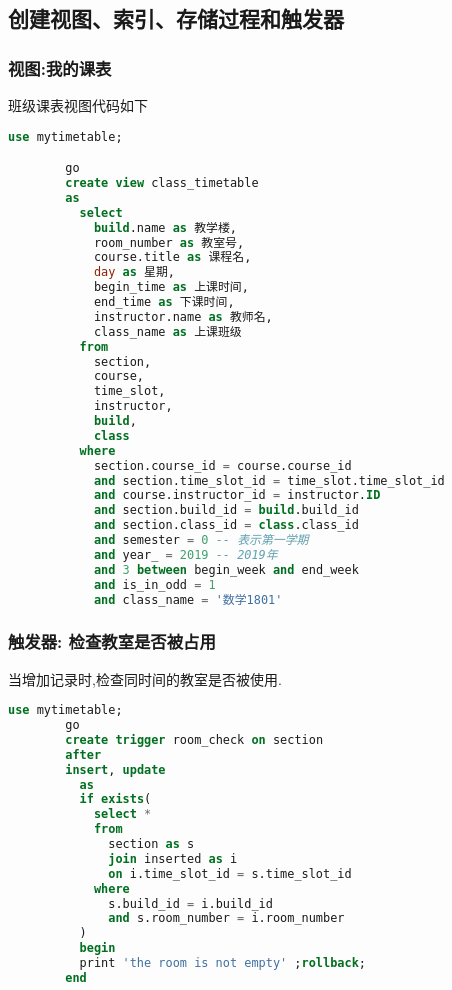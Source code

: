 \documentclass{myreport}
\begin{document}
  \subsection{创建视图、索引、存储过程和触发器}
    \subsubsection{视图:我的课表}
      班级课表视图代码如下
      \begin{lstlisting}[language=sql]
        use mytimetable;

        go
        create view class_timetable
        as
          select
            build.name as 教学楼,
            room_number as 教室号,
            course.title as 课程名,
            day as 星期,
            begin_time as 上课时间,
            end_time as 下课时间,
            instructor.name as 教师名,
            class_name as 上课班级
          from
            section,
            course,
            time_slot,
            instructor,
            build,
            class
          where
            section.course_id = course.course_id
            and section.time_slot_id = time_slot.time_slot_id
            and course.instructor_id = instructor.ID
            and section.build_id = build.build_id
            and section.class_id = class.class_id
            and semester = 0 -- 表示第一学期
            and year_ = 2019 -- 2019年
            and 3 between begin_week and end_week
            and is_in_odd = 1
            and class_name = '数学1801'
      \end{lstlisting}

    \subsubsection{触发器: 检查教室是否被占用}
      当增加记录时,检查同时间的教室是否被使用.\cite{trigger,inserted}
      \begin{lstlisting}[language=sql]
        use mytimetable;
        go
        create trigger room_check on section
        after
        insert, update
          as
          if exists(
            select *
            from
              section as s
              join inserted as i
              on i.time_slot_id = s.time_slot_id
            where
              s.build_id = i.build_id
              and s.room_number = i.room_number
          )
          begin
          print 'the room is not empty' ;rollback;
        end

      \end{lstlisting}
\end{document}
